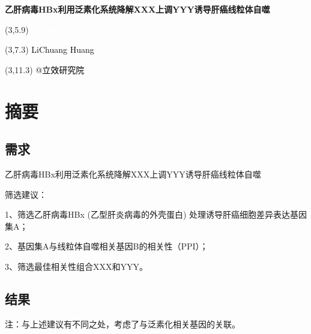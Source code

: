 \documentclass[
]{article}
\author{}
\date{\vspace{-2.5em}}
\begin{document}
\begin{titlepage} 
\begin{center} \textbf{\Huge
乙肝病毒HBx利用泛素化系统降解XXX上调YYY诱导肝癌线粒体自噬}
\vspace{4em} \begin{textblock}{10}(3,5.9) \huge
\textbf{\textcolor{white}{2024-02-27}}
\end{textblock} \begin{textblock}{10}(3,7.3)
\Large \textcolor{black}{LiChuang Huang}
\end{textblock} \begin{textblock}{10}(3,11.3)
\Large \textcolor{black}{@立效研究院}
\end{textblock} \end{center} \end{titlepage}
\restoregeometry


\tableofcontents

\listoffigures

\listoftables

\newpage


\hypertarget{abstract}{%
\section{摘要}\label{abstract}}

\hypertarget{ux9700ux6c42}{%
\subsection{需求}\label{ux9700ux6c42}}

乙肝病毒HBx利用泛素化系统降解XXX上调YYY诱导肝癌线粒体自噬

筛选建议：

1、筛选乙肝病毒HBx (乙型肝炎病毒的外壳蛋白) 处理诱导肝癌细胞差异表达基因集A；

2、基因集A与线粒体自噬相关基因B的相关性（PPI）；

3、筛选最佳相关性组合XXX和YYY。

\hypertarget{ux7ed3ux679c}{%
\subsection{结果}\label{ux7ed3ux679c}}

注：与上述建议有不同之处，考虑了与泛素化相关基因的关联。
\end{document}
